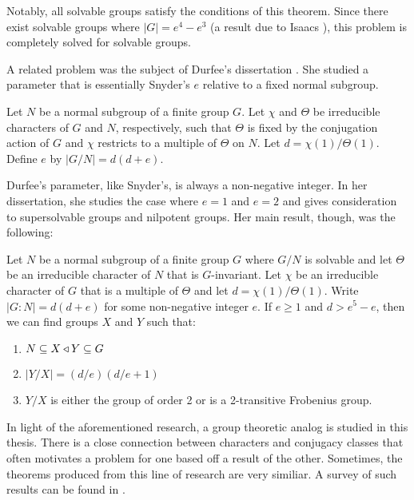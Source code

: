 \documentclass[main.tex]{subfiles}
\begin{document}
\noindent Notably, all solvable groups satisfy the conditions of this theorem. Since there exist solvable groups where $|G| = e^4 - e^3$ (a result due to Isaacs \cite{isaacsarticle}), this problem is completely solved for solvable groups. 

\hss

A related problem was the subject of Durfee's dissertation \cite{durfeedissertation}. She studied a parameter that is essentially Snyder's $e$ relative to a fixed normal subgroup. 

\hss

\begin{definition}
Let $N$ be a normal subgroup of a finite group $G$. Let $\chi$ and $\Theta$ be irreducible characters of $G$ and $N$, respectively, such that $\Theta$ is fixed by the conjugation action of $G$ and $\chi$ restricts to a multiple of $\Theta$ on $N$. Let $d = \chi(1)/\Theta(1)$. Define $e$ by $|G/N| = d(d+e)$.
\end{definition}

\hss

\noindent Durfee's parameter, like Snyder's, is always a non-negative integer. In her dissertation, she studies the case where $e = 1$ and $e = 2$ and gives consideration to supersolvable groups and nilpotent groups. Her main result, though, was the following:

\hss

\begin{theorem}
Let $N$ be a normal subgroup of a finite group $G$ where $G/N$ is solvable and let $\Theta$ be an irreducible character of $N$ that is $G$-invariant. Let $\chi$ be an irreducible character of $G$ that is a multiple of $\Theta$ and let $d = \chi(1)/\Theta(1)$. Write $|G:N| = d(d+e)$ for some non-negative integer $e$. If $e \ge 1$ and $d > e^5 - e$, then we can find groups $X$ and $Y$ such that:
\begin{enumerate}
	\item $N \subseteq X \triangleleft Y \subseteq G$
	\item $|Y/X| = (d/e)(d/e+1)$
	\item $Y/X$ is either the group of order 2 or is a 2-transitive Frobenius group.
\end{enumerate}
\end{theorem}

\hss

In light of the aforementioned research, a group theoretic analog is studied in this thesis. There is a close connection between characters and conjugacy classes that often motivates a problem for one based off a result of the other. Sometimes, the theorems produced from this line of research are very similiar. A survey of such results can be found in \cite{chillagarticle}.
\end{document}
